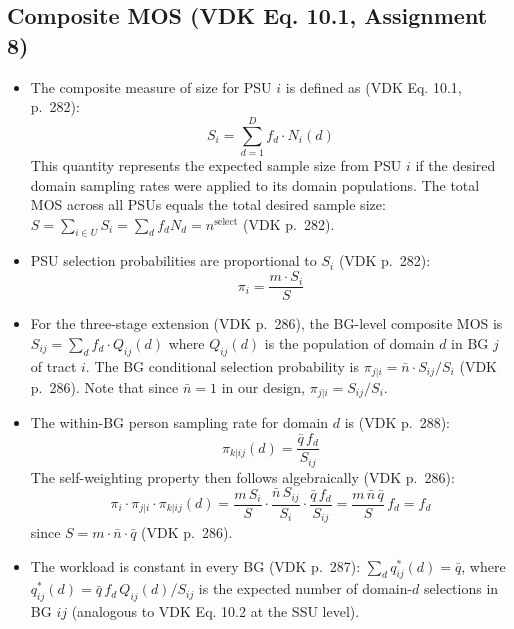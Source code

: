 \documentclass[
  11pt,
]{article}
\begin{document}
\newpage

\subsection{Composite MOS (VDK Eq. 10.1, Assignment 8)}\label{sec-mos}

\begin{itemize}
\item
  The composite measure of size for PSU \(i\) is defined as (VDK Eq.
  10.1, p.~282): \[S_i = \sum_{d=1}^{D} f_d \cdot N_i(d)\] This quantity
  represents the expected sample size from PSU \(i\) if the desired
  domain sampling rates were applied to its domain populations. The
  total MOS across all PSUs equals the total desired sample size:
  \(S = \sum_{i \in U} S_i = \sum_d f_d N_d = n^{\text{select}}\) (VDK
  p.~282).
\item
  PSU selection probabilities are proportional to \(S_i\) (VDK p.~282):
  \[\pi_i = \frac{m \cdot S_i}{S}\]
\item
  For the three-stage extension (VDK p.~286), the BG-level composite MOS
  is \(S_{ij} = \sum_d f_d \cdot Q_{ij}(d)\) where \(Q_{ij}(d)\) is the
  population of domain \(d\) in BG \(j\) of tract \(i\). The BG
  conditional selection probability is
  \(\pi_{j|i} = \bar{n} \cdot S_{ij} / S_i\) (VDK p.~286). Note that
  since \(\bar{n} = 1\) in our design, \(\pi_{j|i} = S_{ij} / S_i\).
\item
  The within-BG person sampling rate for domain \(d\) is (VDK p.~288):
  \[\pi_{k|ij}(d) = \frac{\bar{q} \, f_d}{S_{ij}}\] The self-weighting
  property then follows algebraically (VDK p.~286):
  \[\pi_i \cdot \pi_{j|i} \cdot \pi_{k|ij}(d) = \frac{m \, S_i}{S} \cdot \frac{\bar{n} \, S_{ij}}{S_i} \cdot \frac{\bar{q} \, f_d}{S_{ij}} = \frac{m \, \bar{n} \, \bar{q}}{S} \, f_d = f_d\]
  since \(S = m \cdot \bar{n} \cdot \bar{q}\) (VDK p.~286).
\item
  The workload is constant in every BG (VDK p.~287):
  \(\sum_d q^*_{ij}(d) = \bar{q}\), where
  \(q^*_{ij}(d) = \bar{q} \, f_d \, Q_{ij}(d) / S_{ij}\) is the expected
  number of domain-\(d\) selections in BG \(ij\) (analogous to VDK Eq.
  10.2 at the SSU level).
\end{itemize}
\end{document}
